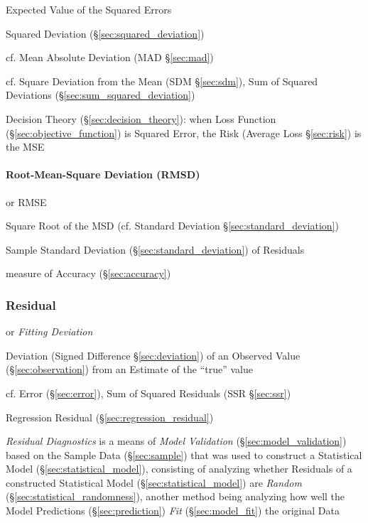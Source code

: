 Expected Value of the Squared Errors

Squared Deviation (\S\ref{sec:squared_deviation})

cf. Mean Absolute Deviation (MAD \S\ref{sec:mad})

cf. Square Deviation from the Mean (SDM \S\ref{sec:sdm}), Sum of Squared
Deviations (\S\ref{sec:sum_squared_deviation})

\fist Decision Theory (\S\ref{sec:decision_theory}): when Loss Function
(\S\ref{sec:objective_function}) is Squared Error, the Risk (Average Loss
\S\ref{sec:risk}) is the MSE



\paragraph{Root-Mean-Square Deviation (RMSD)}\label{sec:rmsd}\hfill

or RMSE

Square Root of the MSD (cf. Standard Deviation \S\ref{sec:standard_deviation})

Sample Standard Deviation (\S\ref{sec:standard_deviation}) of Residuals

measure of Accuracy (\S\ref{sec:accuracy})



\subsubsection{Residual}\label{sec:residual}

or \emph{Fitting Deviation}

Deviation (Signed Difference \S\ref{sec:deviation}) of an Observed Value
(\S\ref{sec:observation}) from an Estimate of the ``true'' value

cf. Error (\S\ref{sec:error}), Sum of Squared Residuals (SSR \S\ref{sec:ssr})

\fist Regression Residual (\S\ref{sec:regression_residual})

\emph{Residual Diagnostics} is a means of \emph{Model Validation}
(\S\ref{sec:model_validation}) based on the Sample Data (\S\ref{sec:sample})
that was used to construct a Statistical Model (\S\ref{sec:statistical_model}),
consisting of analyzing whether Residuals of a constructed Statistical Model
(\S\ref{sec:statistical_model}) are \emph{Random}
(\S\ref{sec:statistical_randomness}), another method being analyzing how well
the Model Predictions (\S\ref{sec:prediction}) \emph{Fit}
(\S\ref{sec:model_fit}) the original Data


